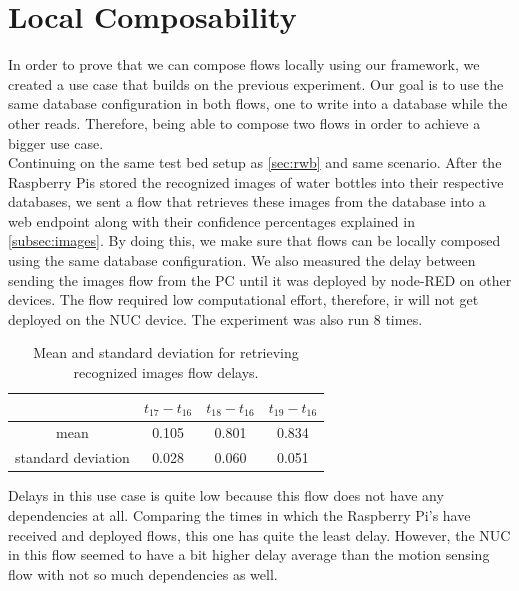 \section{Local Composability}
In order to prove that we can compose flows locally using our framework, we created a use case that builds on the  previous experiment. Our goal is to use the same database configuration in both flows, one to write into a database while the other reads. Therefore, being able to compose two flows in order to achieve a bigger use case.\\

 \noindent Continuing on the same test bed setup as \ref{sec:rwb} and same scenario.  After the Raspberry Pis stored the recognized images of water bottles into their respective  databases, we sent a flow that retrieves these images from the database into a web endpoint along with their confidence percentages explained in \ref{subsec:images}. By doing this, we make sure that flows can be locally composed using the same database configuration. We also measured the delay between sending the images flow from the PC until it was deployed by node-RED on other devices. The flow required low computational effort, therefore, ir will not get deployed on the NUC device. The experiment was also run 8 times.

\begin{table}[H]
\centering
\begin{tabular}{ c | c | c| c }	\toprule
&$t_{17} - t_{16}$  & $t_{18} - t_{16}$  & $t_{19}-t_{16}$ \\ \midrule
mean&	0.105&	0.801&	0.834\\
standard deviation&	0.028&	0.060&	0.051\\
\end{tabular}
\caption{Mean and standard deviation for retrieving recognized images flow delays.}
\label{table:images}
\end{table}

\noindent Delays in this use case is quite low because this flow does not have any dependencies at all. Comparing the times in which the Raspberry Pi's have received and deployed flows, this one  has quite the least delay. However, the NUC in this flow seemed to have a bit higher delay average than the motion sensing flow with not so much dependencies as well.


